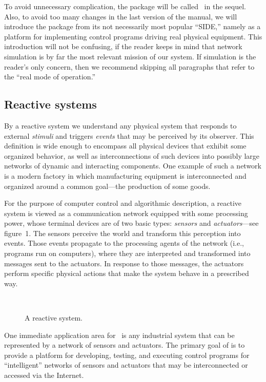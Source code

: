 To avoid unnecessary complication, the package will be called \smurph\ in
the sequel.
Also, to avoid too many changes in the last version of the manual, we will
introduce the package from its not necessarily most popular ``{\sc SIDE},''
namely
as a platform for implementing control programs driving real physical
equipment.
This introduction will not be confusing, if the reader keeps in mind that
network simulation is by far the most relevant mission of our system.
If simulation is the reader's only concern, then we recommend skipping all
paragraphs that refer to the ``real mode of operation.''

\subsection{Reactive systems}
\label{rm_in_rs}

By a reactive system we understand any physical system that
responds to external {\em stimuli\/} and triggers
{\em events\/} that may be perceived by its observer.
This definition is wide enough to encompass
all physical devices that exhibit some organized behavior, as well as
interconnections of such devices into possibly large
networks of dynamic and interacting components.
One example of such a network is a modern factory in which manufacturing
equipment is interconnected and organized around a common goal---the
production of some goods.

For the purpose of computer control and algorithmic description,
a reactive system is viewed as a
communication network equipped with some processing power,
whose terminal devices are of two basic types:
{\em sensors\/} and {\em actuators}---see
figure~1.
The sensors perceive the world and transform this perception into events.
Those events propagate to the processing agents of the network
(i.e., programs run on computers), where they are
interpreted and transformed into messages sent to the actuators.
In response to those messages, the actuators perform specific physical
actions that make the system behave in a prescribed way.

\begin{figure}[htbp]%
\begin{center}
\ 
\caption{A reactive system.}%
\end{center}
\end{figure}%

One immediate application area for \smurph\ is
any industrial system that can be represented by a network of sensors and
actuators.
The primary goal of {\smurph}
is to provide a platform for developing, testing, and executing
control programs for ``intelligent'' networks of sensors and actuators that
may be interconnected or accessed via the Internet.

